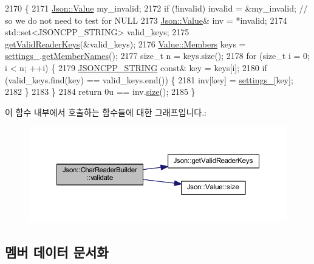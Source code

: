 \begin{DoxyCode}
2170 \{
2171   \hyperlink{class_json_1_1_value}{Json::Value} my\_invalid;
2172   \textcolor{keywordflow}{if} (!invalid) invalid = &my\_invalid;  \textcolor{comment}{// so we do not need to test for NULL}
2173   \hyperlink{class_json_1_1_value}{Json::Value}& inv = *invalid;
2174   std::set<JSONCPP\_STRING> valid\_keys;
2175   \hyperlink{namespace_json_a8c38450840f3d88e9b981ae132f7ad0a}{getValidReaderKeys}(&valid\_keys);
2176   \hyperlink{class_json_1_1_value_a9ae9069983fc38f1928d76f9c79ac64d}{Value::Members} keys = \hyperlink{class_json_1_1_char_reader_builder_ac69b7911ad64c171c51ebaf2ea26d958}{settings\_}.\hyperlink{class_json_1_1_value_a79d7725dce6260317333e69022367ac9}{getMemberNames}();
2177   \textcolor{keywordtype}{size\_t} n = keys.size();
2178   \textcolor{keywordflow}{for} (\textcolor{keywordtype}{size\_t} i = 0; i < n; ++i) \{
2179     \hyperlink{json-forwards_8h_a1e723f95759de062585bc4a8fd3fa4be}{JSONCPP\_STRING} \textcolor{keyword}{const}& key = keys[i];
2180     \textcolor{keywordflow}{if} (valid\_keys.find(key) == valid\_keys.end()) \{
2181       inv[key] = \hyperlink{class_json_1_1_char_reader_builder_ac69b7911ad64c171c51ebaf2ea26d958}{settings\_}[key];
2182     \}
2183   \}
2184   \textcolor{keywordflow}{return} 0u == inv.\hyperlink{class_json_1_1_value_a0ec2808e1d7efa4e9fad938d6667be44}{size}();
2185 \}
\end{DoxyCode}
이 함수 내부에서 호출하는 함수들에 대한 그래프입니다.\+:
\nopagebreak
\begin{figure}[H]
\begin{center}
\leavevmode
\includegraphics[width=350pt]{class_json_1_1_char_reader_builder_af890b5cb70e9b372e41de5c9e6535d21_cgraph}
\end{center}
\end{figure}


\subsection{멤버 데이터 문서화}
\mbox{\label{class_json_1_1_char_reader_builder_ac69b7911ad64c171c51ebaf2ea26d958}} 
